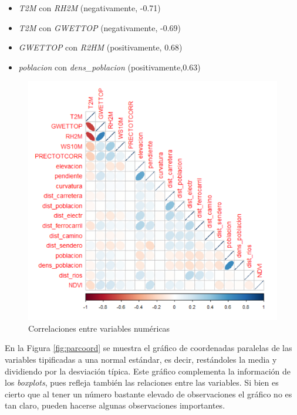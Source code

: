 \documentclass[12pt,a4paper,]{book}
\providecommand{\tightlist}{%
  \setlength{\itemsep}{0pt}\setlength{\parskip}{0pt}}
\numberwithin{dummy}{section}
\theoremstyle{ocrenumbox}
\theoremstyle{blacknumex}
\theoremstyle{blacknumbox}
\theoremstyle{ocrenum}
\theoremstyle{ocrenum}
\begin{document}
\begin{itemize}
\tightlist
\item
  \emph{T2M} con \emph{RH2M} (negativamente, -0.71)
\item
  \emph{T2M} con \emph{GWETTOP} (negativamente, -0.69)\\
\item
  \emph{GWETTOP} con \emph{R2HM} (positivamente, 0.68)
\item
  \emph{poblacion} con \emph{dens\_poblacion} (positivamente,0.63)
\end{itemize}

\begin{figure}[h]
\centering
\includegraphics[width =\textwidth]{graficos/corrplot.png}
\caption{Correlaciones entre variables numéricas}
\label{fig:corrplot}
\end{figure}

En la Figura \ref{fig:parcoord} se muestra el gráfico de coordenadas
paralelas de las variables tipificadas a una normal estándar, es decir,
restándoles la media y dividiendo por la desviación típica. Este gráfico
complementa la información de los \emph{boxplots}, pues refleja también
las relaciones entre las variables. Si bien es cierto que al tener un
número bastante elevado de observaciones el gráfico no es tan claro,
pueden hacerse algunas observaciones importantes.
\end{document}
